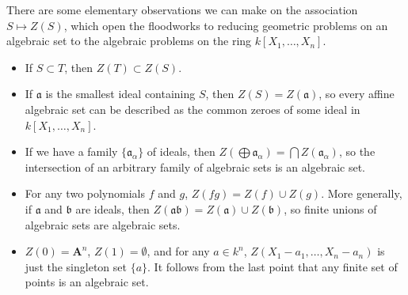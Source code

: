 
There are some elementary observations we can make on the association $S \mapsto Z(S)$, which open the floodworks to reducing geometric problems on an algebraic set to the algebraic problems on the ring $k[X_1, \dots, X_n]$.
%
\begin{itemize}
    \item If $S \subset T$, then $Z(T) \subset Z(S)$.

    \item If $\mathfrak{a}$ is the smallest ideal containing $S$, then $Z(S) = Z(\mathfrak{a})$, so every affine algebraic set can be described as the common zeroes of some ideal in $k[X_1,\dots,X_n]$.

    \item If we have a family $\{ \mathfrak{a}_\alpha \}$ of ideals, then $Z(\bigoplus \mathfrak{a}_\alpha) = \bigcap Z(\mathfrak{a}_\alpha)$, so the intersection of an arbitrary family of algebraic sets is an algebraic set.

    \item For any two polynomials $f$ and $g$, $Z(fg) = Z(f) \cup Z(g)$. More generally, if $\mathfrak{a}$ and $\mathfrak{b}$ are ideals, then $Z(\mathfrak{a}\mathfrak{b}) = Z(\mathfrak{a}) \cup Z(\mathfrak{b})$, so finite unions of algebraic sets are algebraic sets.

    \item $Z(0) = \mathbf{A}^n$, $Z(1) = \emptyset$, and for any $a \in k^n$, $Z(X_1-a_1,\dots,X_n - a_n)$ is just the singleton set $\{ a \}$. It follows from the last point that any finite set of points is an algebraic set.
\end{itemize}

